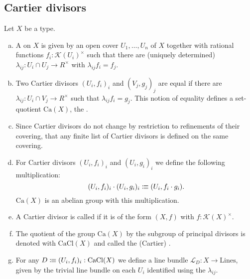 \subsection{Cartier divisors}

\begin{definition}
  Let $X$ be a type.
  \begin{enumerate}[(a)]
  \item A  on $X$ is given by an open cover $U_1,\dots,U_n$ of $X$
    together with rational functions $f_i:\mathcal K(U_i)^\times$
    such that there are (uniquely determined) $\lambda_{ij}:U_i\cap U_j \to R^\times$ with $\lambda_{ij} f_i =f_j$.
  \item Two Cartier divisors $(U_i,f_i)_i$ and $(V_j,g_j)_j$ are equal
    if there are $\lambda_{ij}:U_i\cap V_j \to R^\times$ such that $\lambda_{ij}f_i=g_j$.
    This notion of equality defines a set-quotient $\mathrm{Ca}(X)$, the .
  \item Since Cartier divisors do not change by restriction to refinements of their covering,
    that any finite list of Cartier divisors is defined on the same covering.
  \item For Cartier divisors $(U_i,f_i)_i$ and $(U_i,g_i)_i$ we define the following multiplication:
    \[
      (U_i,f_i)_i\cdot (U_i,g_i)_i \colonequiv (U_i,f_i\cdot g_i)
      \rlap{.}
    \]
    $\mathrm{Ca}(X)$ is an abelian group with this multiplication.
  \item A Cartier divisor is called  if it is of the form $(X,f)$ with $f:\mathcal K(X)^\times$.
  \item The quotient of the group $\mathrm{Ca}(X)$ by the subgroup of principal divisors is denoted with $\mathrm{CaCl}(X)$
    and called the (Cartier) .
  \item For any $D\vcentcolon\mspace{-1.2mu}\equiv (U_i,f_i)_i:\mathrm{CaCl}(X)$ we define a line bundle $\mathcal L_D:X\to \mathrm{Lines}$,
    given by the trivial line bundle on each $U_i$ identified using the $\lambda_{ij}$.
  \end{enumerate}
\end{definition}



